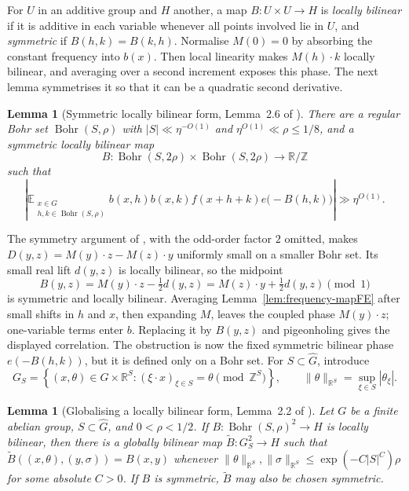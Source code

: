 \documentclass[12pt]{article}
\newtheorem{lemma}[theorem]{Lemma}
\begin{document}
For $U$ in an additive group and $H$ another, a map $B:U\times U\to H$ is
\emph{locally bilinear} if it is additive in each variable whenever all
points involved lie in $U$, and \emph{symmetric} if
$B(h,k)=B(k,h)$.  Normalise $M(0)=0$ by absorbing the constant frequency into
$b(x)$.  Then local linearity makes $M(h)\cdot k$ locally bilinear, and
averaging over a second increment exposes this phase.  The next lemma
symmetrises it so that it can be a quadratic second derivative.

\begin{lemma}[Symmetric locally bilinear form, Lemma~2.6 of
\cite{JamneshanTaoFE}]\label{lem:symmetric-formFE}
There are a regular Bohr set $\operatorname{Bohr}(S,\rho)$ with
$|S|\ll\eta^{-O(1)}$ and $\eta^{O(1)}\ll\rho\leq1/8$, and a symmetric
locally bilinear map
\[
 B:\operatorname{Bohr}(S,2\rho)\times
   \operatorname{Bohr}(S,2\rho)\longrightarrow\mathbb{R}/\mathbb{Z}
\]
such that
\[
 \left|
 \mathbb{E}_{\substack{x\in G\\h,k\in\operatorname{Bohr}(S,\rho)}}
 b(x,h)b(x,k)f(x+h+k)e\bigl(-B(h,k)\bigr)
 \right|
 \gg\eta^{O(1)}.
\]
\end{lemma}

The symmetry argument of \cite[Lemma~9.4]{GreenTaoFE}, with the odd-order
factor $2$ omitted, makes
$D(y,z)=M(y)\cdot z-M(z)\cdot y$ uniformly small on a smaller Bohr set.  Its
small real lift $d(y,z)$ is locally bilinear, so the midpoint
\[
 B(y,z)=M(y)\cdot z-\tfrac12d(y,z)
       =M(z)\cdot y+\tfrac12d(y,z)\pmod 1
\]
is symmetric and locally bilinear.  Averaging Lemma~\ref{lem:frequency-mapFE}
after small shifts in $h$ and $x$, then expanding $M$, leaves the coupled
phase $M(y)\cdot z$; one-variable terms enter $b$.  Replacing it by $B(y,z)$
and pigeonholing gives the displayed correlation.
The obstruction is now the fixed symmetric bilinear phase $e(-B(h,k))$, but
it is defined only on a Bohr set.  For $S\subset\widehat G$, introduce
\[
 G_S=\left\{(x,\theta)\in G\times\mathbb{R}^S:
       (\xi\cdot x)_{\xi\in S}=\theta\pmod{\mathbb{Z}^S}\right\},
 \qquad
 \|\theta\|_{\mathbb{R}^S}=\sup_{\xi\in S}|\theta_\xi|.
\]

\begin{lemma}[Globalising a locally bilinear form, Lemma~2.2 of
\cite{JamneshanTaoFE}]
\label{lem:globalisingFE}
Let $G$ be a finite abelian group, $S\subset\widehat G$, and
$0<\rho<1/2$.  If $B:\operatorname{Bohr}(S,\rho)^2\to H$ is locally
bilinear, then there is a globally bilinear map
$\widetilde B:G_S^2\to H$ such that
$\widetilde B((x,\theta),(y,\sigma))=B(x,y)$ whenever
$\|\theta\|_{\mathbb{R}^S},\|\sigma\|_{\mathbb{R}^S}
 \leq\exp(-C|S|^C)\rho$ for some absolute $C>0$.  If $B$ is symmetric,
$\widetilde B$ may also be chosen symmetric.
\end{lemma}
\end{document}
